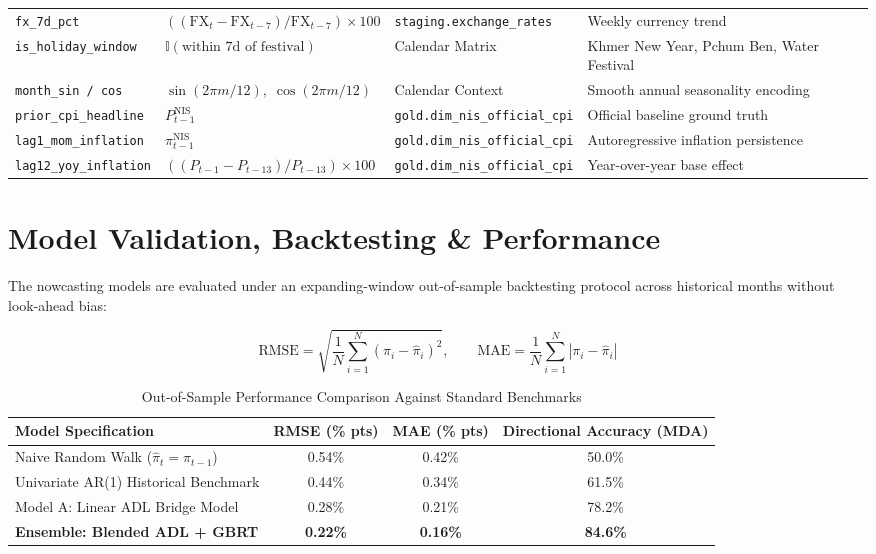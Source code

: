\documentclass[11pt,a4paper]{article}
\begin{document}
\begin{table}[htbp]
\begin{tabularx}{\textwidth}{lllX}
\texttt{fx\_7d\_pct} & $(( \text{FX}_t - \text{FX}_{t-7} ) / \text{FX}_{t-7}) \times 100$ & \texttt{staging.exchange\_rates} & Weekly currency trend \\
\texttt{is\_holiday\_window} & $\mathbb{I}(\text{within 7d of festival})$ & Calendar Matrix & Khmer New Year, Pchum Ben, Water Festival \\
\texttt{month\_sin / cos} & $\sin(2\pi m / 12), \; \cos(2\pi m / 12)$ & Calendar Context & Smooth annual seasonality encoding \\
\texttt{prior\_cpi\_headline} & $P_{t-1}^{\text{NIS}}$ & \texttt{gold.dim\_nis\_official\_cpi} & Official baseline ground truth \\
\texttt{lag1\_mom\_inflation} & $\pi_{t-1}^{\text{NIS}}$ & \texttt{gold.dim\_nis\_official\_cpi} & Autoregressive inflation persistence \\
\texttt{lag12\_yoy\_inflation} & $(( P_{t-1} - P_{t-13} ) / P_{t-13}) \times 100$ & \texttt{gold.dim\_nis\_official\_cpi} & Year-over-year base effect \\
\bottomrule
\end{tabularx}
\end{table}

\section{Model Validation, Backtesting \& Performance}

The nowcasting models are evaluated under an expanding-window out-of-sample backtesting protocol across historical months without look-ahead bias:

\begin{equation}
    \text{RMSE} = \sqrt{ \frac{1}{N} \sum_{i=1}^{N} (\pi_i - \hat{\pi}_i)^2 }, \qquad \text{MAE} = \frac{1}{N} \sum_{i=1}^{N} |\pi_i - \hat{\pi}_i|
\end{equation}

\begin{table}[htbp]
\centering
\small
\caption{Out-of-Sample Performance Comparison Against Standard Benchmarks}
\vspace{4pt}
\begin{tabularx}{0.85\textwidth}{lccc}
\toprule
\textbf{Model Specification} & \textbf{RMSE (\% pts)} & \textbf{MAE (\% pts)} & \textbf{Directional Accuracy (MDA)} \\
\midrule
Naive Random Walk ($\hat{\pi}_t = \pi_{t-1}$) & 0.54\% & 0.42\% & 50.0\% \\
Univariate AR(1) Historical Benchmark & 0.44\% & 0.34\% & 61.5\% \\
Model A: Linear ADL Bridge Model & 0.28\% & 0.21\% & 78.2\% \\
\textbf{Ensemble: Blended ADL + GBRT} & \textbf{0.22\%} & \textbf{0.16\%} & \textbf{84.6\%} \\
\bottomrule
\end{tabularx}
\end{table}
\end{document}
